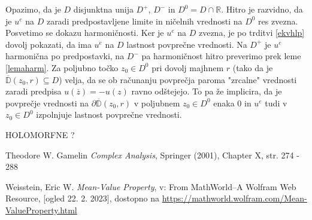 \documentclass[mat1]{fmfdelo}
\begin{document}
    \begin{dokaz}
        Opazimo, da je $D$ disjunktna unija $D^+$, $D^-$ in $D^0 = D \cap \mathbb{R}$.
        Hitro je razvidno, da je $u^e$ na $D$ zaradi predpostavljene limite in ničelnih vrednosti na $D^0$ res zvezna. 
        \newline
        Posvetimo se dokazu harmoničnosti. Ker je $u^e$ na $D$ zvezna, je po trditvi \ref{ekvhlp} dovolj pokazati, da ima $u^e$ na $D$ lastnost povprečne vrednosti.
        Na $D^+$ je $u^e$ harmonična po predpostavki, na $D^-$ pa harmoničnost hitro preverimo prek leme \ref{lemaharm}. 
        Za poljubno točko $z_0 \in D^0$ pri dovolj majhnem $r$ (tako da je $\overline{\mathbb{D}}(z_0,r) \subseteq D$) velja, da se ob računanju povprečja paroma "zrcalne" vrednosti zaradi predpisa $u(\overline{z}) = - u(z)$ ravno odštejejo. 
        To pa že implicira, da je povprečje vrednosti na $\partial \overline{\mathbb{D}}(z_0,r)$ v poljubnem $z_0 \in D^0$ enaka $0$ in $u^e$ tudi v $z_0 \in D^0$ izpolnjuje lastnost povprečne vrednosti.
    \end{dokaz}

    HOLOMORFNE ?
\newpage


\begin{thebibliography}{9}
    Theodore W. Gamelin \emph{Complex Analysis}, Springer (2001), Chapter X, str. 274 - 288

    Weisstein, Eric W. \emph{Mean-Value Property}, v: From MathWorld--A Wolfram Web Resource, [ogled 22. 2. 2023], dostopno na \href{https://mathworld.wolfram.com/Mean-ValueProperty.html}{https://mathworld.wolfram.com/Mean-ValueProperty.html}
\end{thebibliography}
\end{document}
